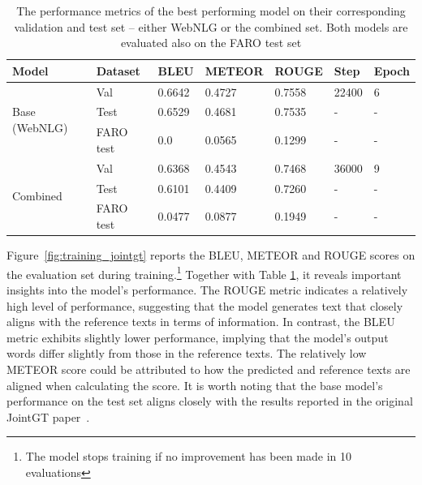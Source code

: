 \documentclass[
hf, %
]{ceurart}
\begin{document}
\begin{table}[ht]
\centering
\begin{tabular}{|l|l|l|l|l|l|l|}
\hline
\textbf{Model}                 & \textbf{Dataset} & \textbf{BLEU} & \textbf{METEOR} & \textbf{ROUGE} & \textbf{Step} & \textbf{Epoch} \\ \hline
\multirow{3}{*}{Base (WebNLG)} & Val              & 0.6642        & 0.4727          & 0.7558         & 22400         & 6              \\ \cline{2-7} 
                               & Test             & 0.6529        & 0.4681          & 0.7535         & -             & -              \\ \cline{2-7} 
                               & FARO test        & 0.0           & 0.0565           & 0.1299         & -             & -              \\ \hline
\multirow{3}{*}{Combined}      & Val              & 0.6368        & 0.4543          & 0.7468         & 36000         & 9              \\ \cline{2-7} 
                               & Test             & 0.6101        & 0.4409          & 0.7260         & -             & -              \\ \cline{2-7} 
                               & FARO test        & 0.0477        & 0.0877          & 0.1949         & -             & -              \\ \hline
\end{tabular}
\caption{The performance metrics of the best performing model on their corresponding validation and test set -- either WebNLG or the combined set. Both models are evaluated also on the FARO test set}
\label{tab:training_jointgt}
\end{table}

Figure~\ref{fig:training_jointgt} reports the BLEU, METEOR and ROUGE scores on the evaluation set during training.\footnote{The model stops training if no improvement has been made in 10 evaluations} Together with Table \ref{tab:training_jointgt}, it reveals important insights into the model's performance. The ROUGE metric indicates a relatively high level of performance, suggesting that the model generates text that closely aligns with the reference texts in terms of information. In contrast, the BLEU metric exhibits slightly lower performance, implying that the model's output words differ slightly from those in the reference texts. The relatively low METEOR score could be attributed to how the predicted and reference texts are aligned when calculating the score. It is worth noting that the base model's performance on the test set aligns closely with the results reported in the original JointGT paper~\cite{JointGT}.
\end{document}
